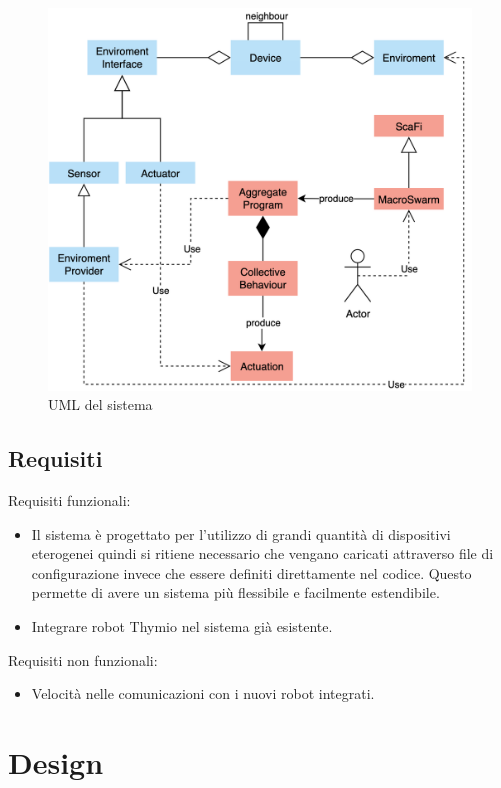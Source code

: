 \documentclass[12pt,a4paper,openright,twoside]{book}
\begin{document}
\begin{figure}
    \centering
    \includegraphics[width=.8\linewidth]{figures/uml.png}
    \caption{UML del sistema}
    \label{fig:uml}
\end{figure}

\section{Requisiti}

Requisiti funzionali:
\begin{itemize}
    \item Il sistema è progettato per l'utilizzo di grandi quantità di dispositivi eterogenei quindi si ritiene necessario che vengano caricati attraverso file di configurazione invece che essere definiti direttamente nel codice. Questo permette di avere un sistema più flessibile e facilmente estendibile.
    \item Integrare robot Thymio nel sistema già esistente.
\end{itemize}

Requisiti non funzionali:
\begin{itemize}
    \item Velocità nelle comunicazioni con i nuovi robot integrati.
\end{itemize}

\chapter{Design}
\label{chap:design}
\end{document}
